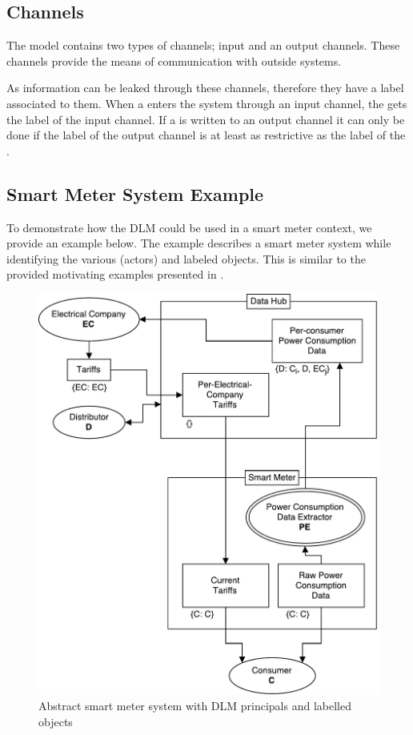 \subsection{Channels}
The model contains two types of channels; input and an output channels.
These channels provide the means of communication with outside systems.

As information can be leaked through these channels, therefore they have a label associated to them.
When a \xvalue{} enters the system through an input channel, the \xvalue{} gets the label of the input channel.
If a \xvalue{} is written to an output channel it can only be done if the label of the output channel is at least as restrictive as the label of the \xvalue{}.

\subsection{Smart Meter System Example}\label{dlm-example}
To demonstrate how the DLM could be used in a smart meter context, we provide an example below.
The example describes a smart meter system while identifying the various \principals{} (actors) and labeled objects.
This is similar to the provided motivating examples presented in \citet{myers1997decentralized}.

\begin{figure}[h]
\centering
\includegraphics[width=\textwidth]{figures/dlm_sm_example.pdf}
\caption{Abstract smart meter system with DLM principals and labelled objects}
\label{dlm:sm_example}
\end{figure}

